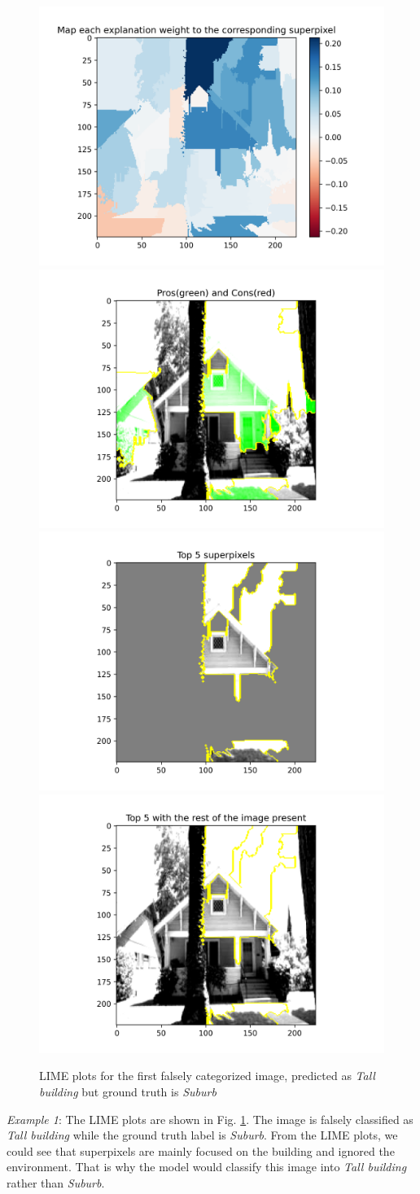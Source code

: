 \begin{figure}[htbp]
    \centering
    \includegraphics[width=0.4\linewidth]{lame_1_Map each explanation weight to the corresponding superpixel.png}
    \includegraphics[width=0.4\linewidth]{lame_1_Pros(green) and Cons(red).png}
    \includegraphics[width=0.4\linewidth]{lame_1_Top 5 superpixels.png}
    \includegraphics[width=0.4\linewidth]{lame_1_Top 5 with the rest of the image present.png}
    \caption{LIME plots for the first falsely categorized image, predicted as \emph{Tall building} but ground truth is \emph{Suburb}}
    \label{fig:LIME_1}
\end{figure}

\emph{Example 1}: The LIME plots are shown in Fig. \ref{fig:LIME_1}. The image is falsely classified as \emph{Tall building} while the ground truth label is \emph{Suburb}. From the LIME plots, we could see that superpixels are mainly focused on the building and ignored the environment. That is why the model would classify this image into \emph{Tall building} rather than \emph{Suburb}.


